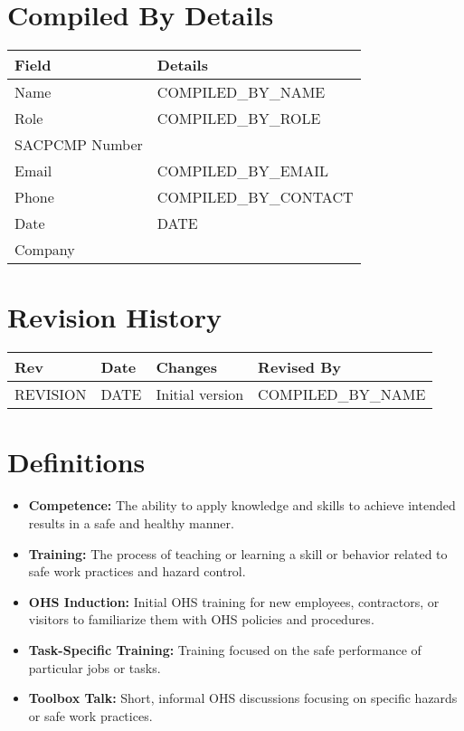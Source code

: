 \documentclass[11pt]{article}
\newcommand{\issueDate}{{{DATE}}}
\newcommand{\compilerName}{{{COMPILED_BY_NAME}}}
\newcommand{\compilerRole}{{{COMPILED_BY_ROLE}}}
\newcommand{\compilerSACPCMP}{}
\newcommand{\compilerEmail}{{{COMPILED_BY_EMAIL}}}
\newcommand{\compilerPhone}{{{COMPILED_BY_CONTACT}}}
\newcommand{\compilerCompany}{}
\newcommand{\revision}{{{REVISION}}}
\begin{document}
\section{Compiled By Details}
\begin{tabularx}{\textwidth}{lX}
  \toprule
  \textbf{Field} & \textbf{Details} \\
  \midrule
  Name & \compilerName \\
  Role & \compilerRole \\
  SACPCMP Number & \compilerSACPCMP \\
  Email & \compilerEmail \\
  Phone & \compilerPhone \\
  Date & \issueDate \\
  Company & \compilerCompany \\
  \bottomrule
\end{tabularx}

\section{Revision History}
\begin{tabularx}{\textwidth}{lXll}
  \toprule
  \textbf{Rev} & \textbf{Date} & \textbf{Changes} & \textbf{Revised By} \\
  \midrule
  \revision & \issueDate & Initial version & \compilerName \\
  \bottomrule
\end{tabularx}

\section{Definitions}
\begin{itemize}
    \item \textbf{Competence:} The ability to apply knowledge and skills to achieve intended results in a safe and healthy manner.
    \item \textbf{Training:} The process of teaching or learning a skill or behavior related to safe work practices and hazard control.
    \item \textbf{OHS Induction:} Initial OHS training for new employees, contractors, or visitors to familiarize them with OHS policies and procedures.
    \item \textbf{Task-Specific Training:} Training focused on the safe performance of particular jobs or tasks.
    \item \textbf{Toolbox Talk:} Short, informal OHS discussions focusing on specific hazards or safe work practices.
\end{itemize}
\end{document}
